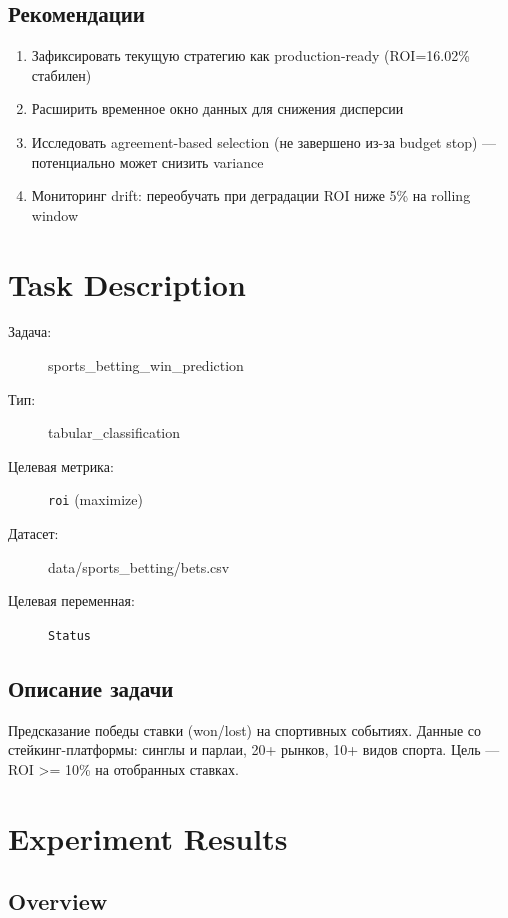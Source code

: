 \documentclass[12pt,a4paper]{article}
\begin{document}
\subsection{Рекомендации}
\begin{enumerate}
  \item Зафиксировать текущую стратегию как production-ready (ROI=16.02\% стабилен)
  \item Расширить временное окно данных для снижения дисперсии
  \item Исследовать agreement-based selection (не завершено из-за budget stop) — потенциально может снизить variance
  \item Мониторинг drift: переобучать при деградации ROI ниже 5\% на rolling window
\end{enumerate}




\section{Task Description}

\begin{description}
    \item[Задача:] sports\_betting\_win\_prediction
    \item[Тип:] tabular\_classification
    \item[Целевая метрика:] \texttt{roi}
        (maximize)
    \item[Датасет:] data/sports\_betting/bets.csv
    \item[Целевая переменная:] \texttt{Status}
\end{description}

\subsection*{Описание задачи}
Предсказание победы ставки (won/lost) на спортивных событиях. Данные со стейкинг-платформы: синглы и парлаи, 20+ рынков, 10+ видов спорта. Цель — ROI >= 10\% на отобранных ставках.




\section{Experiment Results}

\subsection{Overview}
\end{document}
